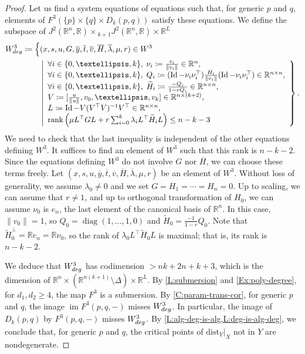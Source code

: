 \documentclass{amsart}
\newcommand{\R}{\mathbb{R}}
\newcommand{\dist}{{\mathrm{dist}_Y|_X}}
\def\Id{\operatorname{Id}}
\theoremstyle{definition}
\theoremstyle{remark}
\begin{document}
\begin{proof}
Let us find a system equations of equations such that, for generic $p$ and $q$, elements of $F^3(\{p\} \times \{q\} \times D_k(p, q))$ satisfy these equations.
We define the subspace of $J^2(\R^n, \R) \times {}_{k + 1} J^2(\R^n, \R) \times \R^L$
\begin{align}
W^3_{\textnormal{deg}} \coloneqq \Big\{ & (x, s, u, G, \overline{y}, \overline{t}, \overline{v}, \overline{H}, \overline{\lambda}, \mu, r) \in W^3 \\
& \left| \begin{array}{l}
\forall i \in \{0, \ldots, k\}, \; \nu_i \coloneqq \frac{v_i}{\| v_i \|} \in \R^n, \\
\forall i \in \{0, \ldots, k\}, \; Q_i \coloneqq (\Id - \nu_i \nu_i^\top) \frac{H_i}{\|v_i\|} (\Id - \nu_i \nu_i^\top) \in \R^{n \times n}, \\
\forall i \in \{0, \ldots, k\}, \; \widetilde{H}_i \coloneqq \frac{-Q_i}{1 - r Q_i} \in \R^{n \times n}, \\
V \coloneqq [\frac{u}{\|u\|}, v_0, \ldots, v_k] \in \R^{n \times (k + 2)}, \\
L \coloneqq \Id - V (V^\top V)^{-1} V^\top \in \R^{n \times n}, \\
\operatorname{rank} \left( \mu L^\top G L + r \sum_{i = 0}^k \lambda_i L^\top \widetilde{H}_i L \right) \leq n - k - 3 
\end{array}
\right\}.
\end{align}
We need to check that the last inequality is independent of the other equations defining $W^3$. It suffices to find an element of $W^3$ such that this rank is $n - k - 2$. Since the equations defining $W^3$ do not involve $G$ nor $\overline{H}$, we can choose these terms freely. Let $(x, s, u, \overline{y}, \overline{t}, \overline{v}, \overline{H}, \overline{\lambda}, \mu, r)$ be an element of $W^3$. Without loss of generality, we assume $\lambda_0 \neq 0$ and we set $G = H_1 = \cdots = H_n = 0$. Up to scaling, we can assume that $r \neq 1$, and up to orthogonal transformation of $H_0$, we can assume $\nu_0$ is $e_n$, the last element of the canonical basis of $\R^n$. In this case, $\| v_0 \| = 1$, so $Q_0 = \operatorname{diag}(1, \ldots, 1, 0)$ and $\widetilde{H}_0 = \frac{-1}{1 - r} Q_0$. Note that $\widetilde{H}_0^\bot = \R e_n = \R \nu_0$, so the rank of $\lambda_0 L^\top \widetilde{H}_0 L$ is maximal; that is, its rank is $n - k - 2$.

We deduce that $W^3_{\textnormal{deg}}$ has codimension $> nk + 2n + k + 3$, which is the dimension of $\R^n \times (\R^{n(k + 1)} \setminus \Delta) \times \R^L$. By \cref{L:submersion} and \cref{Ex:poly-degree}, for $d_1, d_2 \geq 4$, the map $F^3$ is a submersion.
By \cref{C:param-trans-cor}, for generic $p$ and $q$, the image $\operatorname{im} F^3(p, q, -)$ misses $W^3_{\textnormal{deg}}$. In particular, the image of $D_k(p, q)$ by $F^3(p, q, -)$ misses $W^3_{\textnormal{deg}}$. By \cref{L:alg-deg-is-alg,L:deg-is-alg-deg}, we conclude that, for generic $p$ and $q$, the critical points of $\dist$ not in $Y$ are nondegenerate.
\end{proof}
\end{document}
